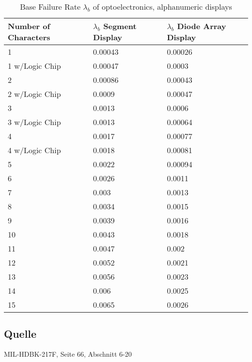 \begin{table}[ht]
{\centering

\begin{tabular}{|p{4.5cm}|p{4.5cm}|p{4.5cm}|}
    \hline
    \textbf{Number of Characters} & \textbf{$\lambda_b$ Segment Display} & \textbf{$\lambda_b$ Diode Array Display} \\
    \hline
    1 & 0.00043 & 0.00026 \\
    \hline
    1 w/Logic Chip & 0.00047 & 0.0003 \\
    \hline
    2 & 0.00086 & 0.00043 \\
    \hline
    2 w/Logic Chip & 0.0009 & 0.00047 \\
    \hline
    3 & 0.0013 & 0.0006 \\
    \hline
    3 w/Logic Chip & 0.0013 & 0.00064 \\
    \hline
    4 & 0.0017 & 0.00077 \\
    \hline
    4 w/Logic Chip & 0.0018 & 0.00081 \\
    \hline
    5 & 0.0022 & 0.00094 \\
    \hline
    6 & 0.0026 & 0.0011 \\
    \hline
    7 & 0.003 & 0.0013 \\
    \hline
    8 & 0.0034 & 0.0015 \\
    \hline
    9 & 0.0039 & 0.0016 \\
    \hline
    10 & 0.0043 & 0.0018 \\
    \hline
    11 & 0.0047 & 0.002 \\
    \hline
    12 & 0.0052 & 0.0021 \\
    \hline
    13 & 0.0056 & 0.0023 \\
    \hline
    14 & 0.006 & 0.0025 \\
    \hline
    15 & 0.0065 & 0.0026 \\
    \hline
\end{tabular}

\caption{Base Failure Rate $\lambda_b$ of optoelectronics, alphanumeric displays}

\label{tab:bfr_optoelectronics_alphanumeric_displays}
\par}
\subsection*{Quelle}
MIL-HDBK-217F, Seite 66, Abschnitt 6-20
\end{table}